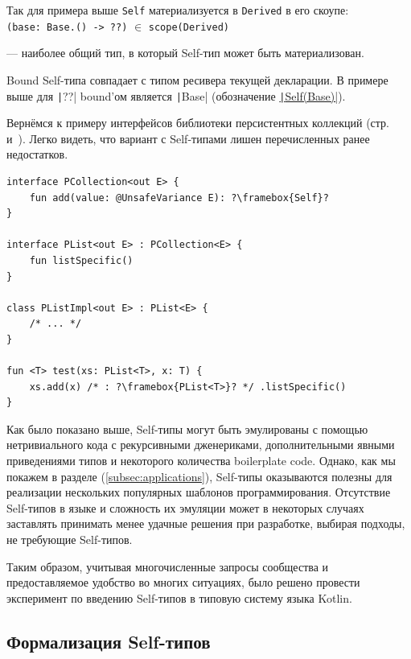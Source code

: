 Так для примера выше \texttt{Self} материализуется в \texttt{Derived} в его скоупе: \\
\texttt{(base: Base.() -> ??)} $\in$ \texttt{scope(Derived)}

\begin{definition}
    \label{def:bound}
     --- наиболее общий тип, в который Self-тип может быть материализован.
\end{definition}

Bound Self-типа совпадает с типом ресивера текущей декларации.
В примере выше для \texttt|??| bound'ом является \texttt|Base| (обозначение \underline{\texttt|Self(Base)|}).

Вернёмся к примеру интерфейсов библиотеки персистентных коллекций (стр.~\pageref{subsubsec:recursive-generics} и~\pageref{subsubsec:abstract-override}).
Легко видеть, что вариант с Self-типами лишен перечисленных ранее недостатков.

\begin{verbatim}
interface PCollection<out E> {
    fun add(value: @UnsafeVariance E): ?\framebox{Self}?
}

interface PList<out E> : PCollection<E> {
    fun listSpecific()
}

class PListImpl<out E> : PList<E> {
    /* ... */
}

fun <T> test(xs: PList<T>, x: T) {
    xs.add(x) /* : ?\framebox{PList<T>}? */ .listSpecific()
}
\end{verbatim}

Как было показано выше, Self-типы могут быть эмулированы с помощью нетривиального кода с рекурсивными дженериками, дополнительными явными приведениями типов и некоторого количества boilerplate code.
Однако, как мы покажем в разделе (\ref{subsec:applications}), Self-типы оказываются полезны для реализации нескольких популярных шаблонов программирования.
Отсутствие Self-типов в языке и сложность их эмуляции может в некоторых случаях заставлять принимать менее удачные решения при разработке, выбирая подходы, не требующие Self-типов.

Таким образом, учитывая многочисленные запросы сообщества и предоставляемое удобство во многих ситуациях, было решено провести эксперимент по введению Self-типов в типовую систему языка Kotlin.


\subsection{Формализация Self-типов} \label{subsec:formalizaton}

